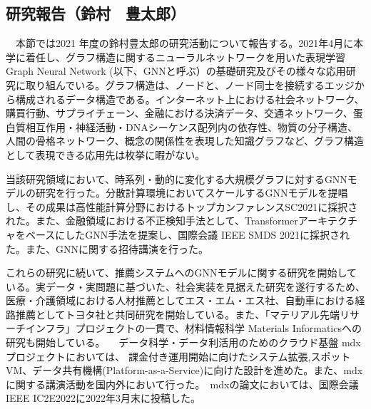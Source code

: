
\subsection{研究報告（鈴村　豊太郎）}

　本節では2021 年度の鈴村豊太郎の研究活動について報告する。2021年4月に本学に着任し、グラフ構造に関するニューラルネットワークを用いた表現学習 Graph Neural Network (以下、GNNと呼ぶ）の基礎研究及びその様々な応用研究に取り組んでいる。グラフ構造は、ノードと、ノード同士を接続するエッジから構成されるデータ構造である。インターネット上における社会ネットワーク、購買行動、サプライチェーン、金融における決済データ、交通ネットワーク、蛋白質相互作用・神経活動・DNAシーケンス配列内の依存性、物質の分子構造、人間の骨格ネットワーク、概念の関係性を表現した知識グラフなど、グラフ構造として表現できる応用先は枚挙に暇がない。
\par
当該研究領域において、時系列・動的に変化する大規模グラフに対するGNNモデルの研究を行った。分散計算環境においてスケールするGNNモデルを提唱し、その成果は高性能計算分野におけるトップカンファレンスSC2021\cite{suzumura-sc2021}に採択された。また、金融領域における不正検知手法として、TransformerアーキテクチャをベースにしたGNN手法を提案し、国際会議 IEEE SMDS 2021\cite{suzumura-smds21}に採択された。また、GNNに関する招待講演\cite{suzumura-canon2021}を行った。

これらの研究に続いて、推薦システムへのGNNモデルに関する研究を開始している。実データ・実問題に基づいた、社会実装を見据えた研究を遂行するため、医療・介護領域における人材推薦としてエス・エム・エス社、自動車における経路推薦としてトヨタ社と共同研究を開始している。また、「マテリアル先端リサーチインフラ」プロジェクトの一貫で、材料情報科学 Materials Informaticsへの研究も開始している。
　データ科学・データ利活用のためのクラウド基盤 mdx プロジェクトにおいては、 課金付き運用開始に向けたシステム拡張,スポットVM、データ共有機構(Platform-as-a-Service)に向けた設計を進めた。また、mdxに関する講演活動を国内外において行った\cite{suzumura-axies2021,suzumura-nanotec2021, suzumura-nci2021}。　mdxの論文においては、国際会議IEEE IC2E2022に2022年3月末に投稿した。

